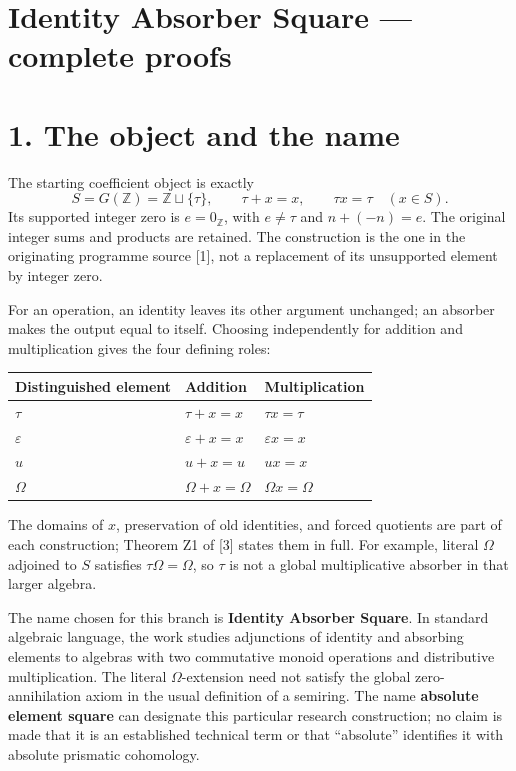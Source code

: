 \documentclass[
]{article}
\author{}
\date{}
\newcounter{none} %
\begin{document}
{
\setcounter{tocdepth}{3}
\tableofcontents
}
\section{Identity Absorber Square --- complete
proofs}\label{identity-absorber-square-complete-proofs}

\section{1. The object and the name}\label{the-object-and-the-name}

The starting coefficient object is exactly \[
S=G(\mathbb Z)=\mathbb Z\sqcup\{\tau\},\qquad
\tau+x=x,\qquad \tau x=\tau\quad(x\in S).
\] Its supported integer zero is \(e=0_{\mathbb Z}\), with \(e\ne\tau\)
and \(n+(-n)=e\). The original integer sums and products are retained.
The construction is the one in the originating programme source {[}1{]},
not a replacement of its unsupported element by integer zero.

For an operation, an identity leaves its other argument unchanged; an
absorber makes the output equal to itself. Choosing independently for
addition and multiplication gives the four defining roles:

{\def\LTcaptype{none} %
\begin{longtable}[]{@{}lll@{}}
\toprule\noalign{}
Distinguished element & Addition & Multiplication \\
\midrule\noalign{}
\endhead
\bottomrule\noalign{}
\endlastfoot
\(\tau\) & \(\tau+x=x\) & \(\tau x=\tau\) \\
\(\varepsilon\) & \(\varepsilon+x=x\) & \(\varepsilon x=x\) \\
\(u\) & \(u+x=u\) & \(ux=x\) \\
\(\Omega\) & \(\Omega+x=\Omega\) & \(\Omega x=\Omega\) \\
\end{longtable}
}

The domains of \(x\), preservation of old identities, and forced
quotients are part of each construction; Theorem Z1 of {[}3{]} states
them in full. For example, literal \(\Omega\) adjoined to \(S\)
satisfies \(\tau\Omega=\Omega\), so \(\tau\) is not a global
multiplicative absorber in that larger algebra.

The name chosen for this branch is \textbf{Identity Absorber Square}. In
standard algebraic language, the work studies adjunctions of identity
and absorbing elements to algebras with two commutative monoid
operations and distributive multiplication. The literal
\(\Omega\)-extension need not satisfy the global zero-annihilation axiom
in the usual definition of a semiring. The name \textbf{absolute element
square} can designate this particular research construction; no claim is
made that it is an established technical term or that ``absolute''
identifies it with absolute prismatic cohomology.
\end{document}
